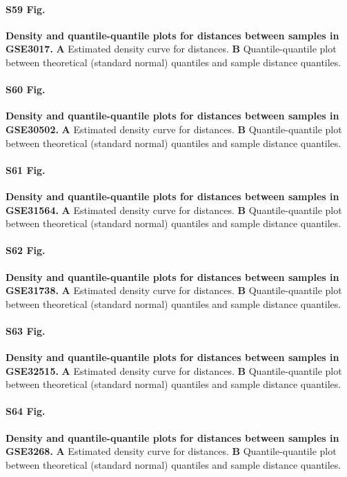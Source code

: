 \documentclass[10pt,letterpaper]{article}
\begin{document}
\paragraph*{S59 Fig.}
\hypertarget{S59_Fig}{
{\bf Density and quantile-quantile plots for distances between samples in GSE3017.} \textbf{A} Estimated density curve for distances. \textbf{B} Quantile-quantile plot between theoretical (standard normal) quantiles and sample distance quantiles.}

\paragraph*{S60 Fig.}
\hypertarget{S60_Fig}{
{\bf Density and quantile-quantile plots for distances between samples in GSE30502.} \textbf{A} Estimated density curve for distances. \textbf{B} Quantile-quantile plot between theoretical (standard normal) quantiles and sample distance quantiles.}

\paragraph*{S61 Fig.}
\hypertarget{S61_Fig}{
{\bf Density and quantile-quantile plots for distances between samples in GSE31564.} \textbf{A} Estimated density curve for distances. \textbf{B} Quantile-quantile plot between theoretical (standard normal) quantiles and sample distance quantiles.}

\paragraph*{S62 Fig.}
\hypertarget{S62_Fig}{
{\bf Density and quantile-quantile plots for distances between samples in GSE31738.} \textbf{A} Estimated density curve for distances. \textbf{B} Quantile-quantile plot between theoretical (standard normal) quantiles and sample distance quantiles.}

\paragraph*{S63 Fig.}
\hypertarget{S63_Fig}{
{\bf Density and quantile-quantile plots for distances between samples in GSE32515.} \textbf{A} Estimated density curve for distances. \textbf{B} Quantile-quantile plot between theoretical (standard normal) quantiles and sample distance quantiles.}

\paragraph*{S64 Fig.}
\hypertarget{S64_Fig}{
{\bf Density and quantile-quantile plots for distances between samples in GSE3268.} \textbf{A} Estimated density curve for distances. \textbf{B} Quantile-quantile plot between theoretical (standard normal) quantiles and sample distance quantiles.}
\end{document}

